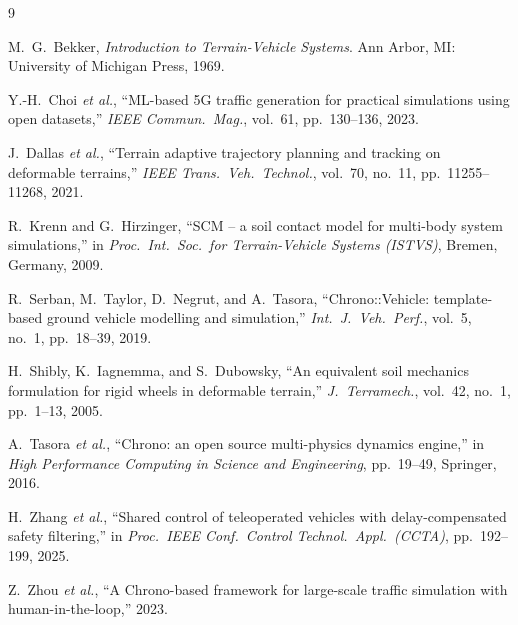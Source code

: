 \documentclass[conference,letterpaper,10pt]{IEEEtran}
\begin{document}
\begin{thebibliography}{9}

  M.~G.~Bekker, \emph{Introduction to Terrain-Vehicle Systems}.
  Ann Arbor, MI: University of Michigan Press, 1969.

  Y.-H.~Choi \emph{et al.}, ``ML-based 5G traffic generation for
  practical simulations using open datasets,''
  \emph{IEEE Commun.\ Mag.}, vol.~61, pp.~130--136, 2023.

  J.~Dallas \emph{et al.}, ``Terrain adaptive trajectory planning
  and tracking on deformable terrains,''
  \emph{IEEE Trans.\ Veh.\ Technol.},
  vol.~70, no.~11, pp.~11255--11268, 2021.

  R.~Krenn and G.~Hirzinger, ``SCM -- a soil contact model for
  multi-body system simulations,'' in
  \emph{Proc.\ Int.\ Soc.\ for Terrain-Vehicle Systems (ISTVS)},
  Bremen, Germany, 2009.

  R.~Serban, M.~Taylor, D.~Negrut, and A.~Tasora,
  ``Chrono::Vehicle: template-based ground vehicle modelling and
  simulation,''
  \emph{Int.\ J.\ Veh.\ Perf.}, vol.~5, no.~1, pp.~18--39, 2019.

  H.~Shibly, K.~Iagnemma, and S.~Dubowsky, ``An equivalent soil
  mechanics formulation for rigid wheels in deformable terrain,''
  \emph{J.\ Terramech.}, vol.~42, no.~1, pp.~1--13, 2005.

  A.~Tasora \emph{et al.}, ``Chrono: an open source multi-physics
  dynamics engine,'' in
  \emph{High Performance Computing in Science and Engineering},
  pp.~19--49, Springer, 2016.

  H.~Zhang \emph{et al.}, ``Shared control of teleoperated vehicles
  with delay-compensated safety filtering,'' in
  \emph{Proc.\ IEEE Conf.\ Control Technol.\ Appl.\ (CCTA)},
  pp.~192--199, 2025.

  Z.~Zhou \emph{et al.}, ``A Chrono-based framework for large-scale
  traffic simulation with human-in-the-loop,'' 2023.

\end{thebibliography}
\end{document}
